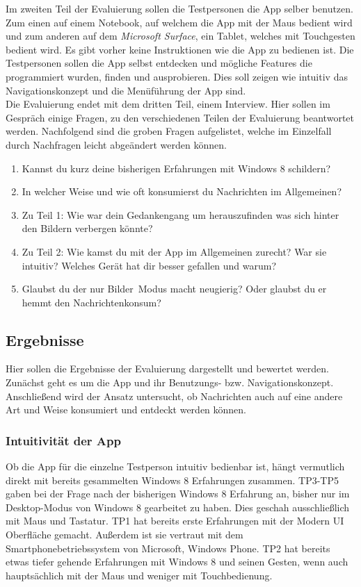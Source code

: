 \documentclass[12pt,a4paper,bibtotoc,abstracton]{scrartcl}
\begin{document}
Im zweiten Teil der Evaluierung sollen die Testpersonen die App selber benutzen. Zum einen auf einem Notebook, auf welchem die App mit der Maus bedient wird und zum anderen auf dem \textit{Microsoft Surface}, ein Tablet, welches mit Touchgesten bedient wird. Es gibt vorher keine Instruktionen wie die App zu bedienen ist. Die Testpersonen sollen die App selbst entdecken und mögliche Features die programmiert wurden, finden und ausprobieren. Dies soll zeigen wie intuitiv das Navigationskonzept und die Menüführung der App sind.\\

Die Evaluierung endet mit dem dritten Teil, einem Interview. Hier sollen im Gespräch einige Fragen, zu den verschiedenen Teilen der Evaluierung beantwortet werden. Nachfolgend sind die groben Fragen aufgelistet, welche im Einzelfall durch Nachfragen leicht abgeändert werden können.

\begin{enumerate}
	\item Kannst du kurz deine bisherigen Erfahrungen mit Windows 8 schildern?
	\item In welcher Weise und wie oft konsumierst du Nachrichten im Allgemeinen? 
	\item Zu Teil 1: Wie war dein Gedankengang um herauszufinden was sich hinter den Bildern verbergen könnte?
	\item Zu Teil 2: Wie kamst du mit der App im Allgemeinen zurecht? War sie intuitiv? Welches Gerät hat dir besser gefallen und warum?
	\item Glaubst du der \glqq nur Bilder\grqq\ Modus macht neugierig? Oder glaubst du er hemmt den Nachrichtenkonsum? 
\end{enumerate}




\subsection{Ergebnisse}
\label{subsec:ergebnisse}
Hier sollen die Ergebnisse der Evaluierung dargestellt und bewertet werden. Zunächst geht es um die App und ihr Benutzungs- bzw. Navigationskonzept. Anschließend wird der Ansatz untersucht, ob Nachrichten auch auf eine andere Art und Weise konsumiert und entdeckt werden können.


\subsubsection{Intuitivität der App} 
\label{subsubsec:intuitivitätderapp}
Ob die App für die einzelne Testperson intuitiv bedienbar ist, hängt vermutlich direkt mit bereits gesammelten Windows 8 Erfahrungen zusammen. TP3-TP5 gaben bei der Frage nach der bisherigen Windows 8 Erfahrung an, bisher nur im Desktop-Modus von Windows 8 gearbeitet zu haben. Dies geschah ausschließlich mit Maus und Tastatur. TP1 hat bereits erste Erfahrungen mit der Modern UI Oberfläche gemacht. Außerdem ist sie vertraut mit dem Smartphonebetriebssystem von Microsoft, Windows Phone. TP2 hat bereits etwas tiefer gehende Erfahrungen mit Windows 8 und seinen Gesten, wenn auch hauptsächlich mit der Maus und weniger mit Touchbedienung.\\
\end{document}
